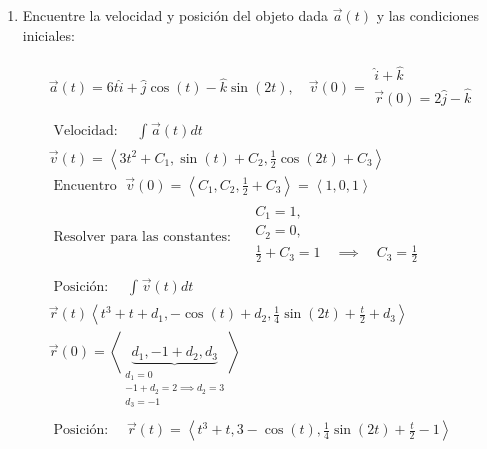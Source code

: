 \begin{enumerate}
    \item Encuentre la velocidad y posición del objeto dada $\vec{a}(t)$ y las condiciones iniciales:
        \begin{center}
            \begin{align*}
                \vec{a}(t)= 6 t \hat{i}+ \hat{j}  \cos(t)- \hat{k} \sin(2t), \quad \vec{v}(0) = \begin{matrix}
                    \hat{i} + \hat{k} \\ 
                    \vec{r}(0) = 2 \hat{j}  - \hat{k} \\ 
                \end{matrix} \\ 
                \text{  Velocidad:   } \quad \int_{}^{}\vec{a}(t)dt \\ 
                \vec{v}(t) = \left\langle 3t^2+C_1, \sin(t)+C_2, \frac{1}{2}\cos(2t)+C_3 \right\rangle \\ 
                \text{  Encuentro   } \; \vec{v}(0) = \left\langle C_1,C_2,\frac{1}{2} + C_3 \right\rangle  = \left\langle 1,0,1 \right\rangle \\
                \text{  Resolver para las constantes:   } \quad \begin{matrix}
                    C_1 = 1, \\  C_2 = 0, \\  \frac{1}{2} + C_3 = 1 \quad \implies  \quad C_3 = \frac{1}{2} \\ 
                \end{matrix} \\ 
                \text{  Posición:   } \quad \int_{}^{}\vec{v}(t)dt \\ 
                \vec{r}(t) \left\langle t^3+t+d_1, -\cos(t)+d_2, \frac{1}{4}\sin(2t) + \frac{t}{2} + d_3 \right\rangle \\ 
                \vec{r}(0) = \left\langle \underbrace{d_1,-1+d_2,d_3}_{\begin{matrix}
                    d_1 = 0 \\ 
                    -1+d_2=2 \implies d_2 = 3 \\ 
                    d_3 = -1 \\ 
                \end{matrix}} \right\rangle  \\
                \text{  Posición:   }\quad \vec{r}(t)= \left\langle t^3+t,3-\cos(t),\frac{1}{4}\sin(2t)+\frac{t}{2}-1 \right\rangle \\ 
            \end{align*}
        \end{center}
    

\end{enumerate}
